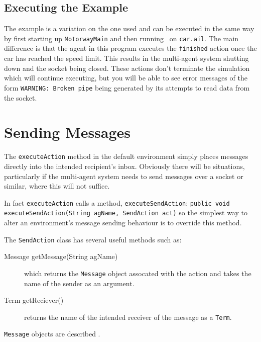 \subsection{Executing the Example}
The example is a variation on the one used  and can be executed in the same way by first starting up \texttt{MotorwayMain} and then running \ail\ on \texttt{car.ail}.  The main difference is that the agent in this program executes the \lstinline{finished} action once the car has reached the speed limit.  This results in the multi-agent system shutting down and the socket being closed.  These actions don't terminate the simulation which will continue executing, but you will be able to see error messages of the form \texttt{WARNING: Broken pipe} being generated by its attempts to read data from the socket.

\section{Sending Messages}
The \texttt{executeAction} method in the default environment simply places messages directly into the intended recipient's inbox.  Obviously there will be situations, particularly if the multi-agent system needs to send messages over a socket or similar, where this will not suffice.

In fact \texttt{executeAction} calls a method, \texttt{executeSendAction}: \texttt{public void executeSendAction(String agName, SendAction act)} so the simplest way to alter an environment's message sending behaviour is to override this method.

The \texttt{SendAction} class has several useful methods such as:
\begin{description}
\item[Message getMessage(String agName)] which returns the \texttt{Message} object assocated with the action and takes the name of the sender as an argument.
\item[Term getReciever()] returns the name of the intended receiver of the message as a \texttt{Term}.
\end{description}
\texttt{Message} objects are described .

